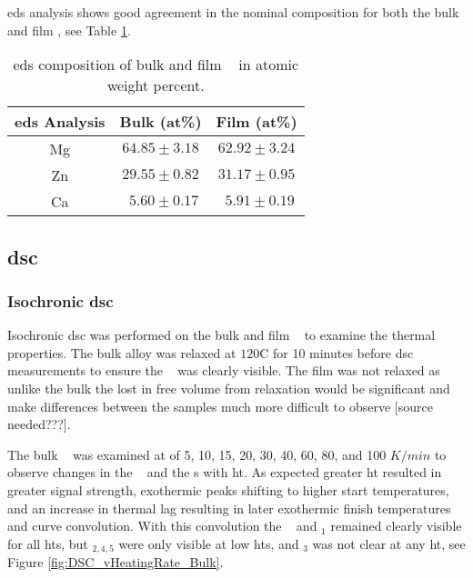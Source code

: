 \documentclass[a4paper,12pt,oneside]{article}%
\begin{document}
\acrshort{eds} analysis shows good agreement in the nominal composition for both the bulk and film \MgZnCa, see Table \ref{tab:EDS_Composition}.

\begin{table}[h]
	\centering
	\begin{tabular}{ c c c }
		\toprule
		\acrshort{eds} Analysis & Bulk (at\%)  & Film (at\%)  \\
		\midrule
		Mg & $64.85 \pm 3.18$ & $62.92 \pm 3.24$ \\
		Zn & $29.55 \pm 0.82$ & $31.17 \pm 0.95$ \\
		Ca & $~~ 5.60 \pm 0.17$ & $~~ 5.91 \pm 0.19$ \\ 
		\bottomrule
	\end{tabular}
	\caption{\acrshort{eds} composition of bulk and film \MgZnCa~ in atomic weight percent.}
	\label{tab:EDS_Composition}
\end{table}

\subsection{\acrshort{dsc}}
\subsubsection{Isochronic \acrshort{dsc}}
Isochronic \acrshort{dsc} was performed on the bulk and film \MgZnCa~ to examine the thermal properties. The bulk alloy was relaxed at $120$\degree C for 10 minutes before \acrshort{dsc} measurements to ensure the \Tg~ was clearly visible. The film was not relaxed as unlike the bulk the lost in free volume from relaxation would be significant and make differences between the samples much more difficult to observe [source needed???]. 

The bulk \MgZnCa~ was examined at  of 5, 10, 15, 20, 30, 40, 60, 80, and 100 $K/min$ to observe changes in the \Tg~ and the \Tx s with \gls{ht}. As expected greater \gls{ht} resulted in greater signal strength, exothermic peaks shifting to higher start temperatures, and an increase in thermal lag resulting in later exothermic finish temperatures and curve convolution. With this convolution the \Tg~ and \Tx $_{1}$  remained clearly visible for all \glspl{ht}, but \Tx $_{2,4,5}$ were only visible at low \glspl{ht}, and \Tx $_{3}$ was not clear at any \gls{ht}, see Figure \ref{fig:DSC_vHeatingRate_Bulk}.
\end{document}
